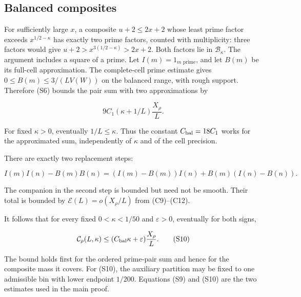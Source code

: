 
\hypertarget{sieve-balanced-composites}{%
\subsection{Balanced composites}\label{sieve-balanced-composites}}

For sufficiently large \(x\), a composite \(u+2\le2x+2\) whose least
prime factor exceeds \(x^{1/2-\kappa}\) has exactly two prime factors,
counted with multiplicity: three factors would give
\(u+2>x^{3(1/2-\kappa)}>2x+2\). Both factors lie in
\(\mathcal B_\kappa\). The argument includes a square of a prime. Let
\(I(m)=1_{m\text{ prime}}\), and let \(B(m)\) be its full-cell
approximation. The complete-cell prime estimate gives
\(0\le B(m)\le3/(LV(W))\) on the balanced range, with rough support.
Therefore (S6) bounds the pair sum with two approximations by

\[
9C_1(\kappa+1/L)\frac{X_\rho}L.
\]

For fixed \(\kappa>0\), eventually \(1/L\le\kappa\). Thus the constant
\(C_{\rm bal}=18C_1\) works for the approximated sum, independently of
\(\kappa\) and of the cell precision.

There are exactly two replacement steps:

\[
I(m)I(n)-B(m)B(n)
=(I(m)-B(m))I(n)+B(m)(I(n)-B(n)).
\]

The companion in the second step is bounded but need not be smooth.
Their total is bounded by \(\mathcal E(L)=o(X_\rho/L)\) from
(C9)--(C12).

It follows that for every fixed \(0<\kappa<1/50\) and \(\varepsilon>0\),
eventually for both signs,

\[
\mathcal C_\rho(L,\kappa)
\le(C_{\rm bal}\kappa+\varepsilon)\frac{X_\rho}L. \tag{S10}
\]

The bound holds first for the ordered prime-pair sum and hence for the
composite mass it covers. For (S10), the auxiliary partition may be
fixed to one admissible bin with lower endpoint \(1/200\). Equations
(S9) and (S10) are the two estimates used in the main proof.
